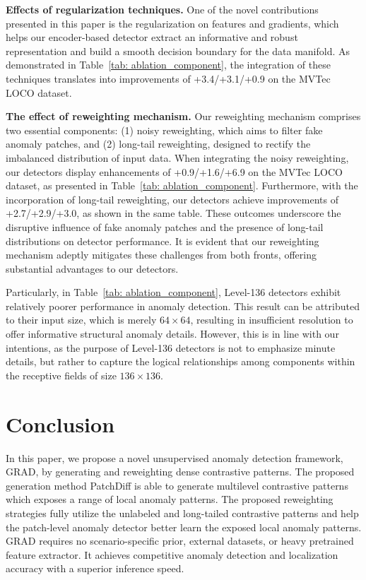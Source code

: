 \documentclass[letterpaper]{article} %
\begin{document}
\textbf{Effects of regularization techniques.} One of the novel contributions presented in this paper is the regularization on features and gradients, which helps our encoder-based detector extract an informative and robust representation and build a smooth decision boundary for the data manifold. As demonstrated in Table~\ref{tab: ablation_component}, the integration of these techniques translates into improvements of +3.4/+3.1/+0.9 on the MVTec LOCO dataset.

\textbf{The effect of reweighting mechanism.} Our reweighting mechanism comprises two essential components: (1) noisy reweighting, which aims to filter fake anomaly patches, and (2) long-tail reweighting, designed to rectify the imbalanced distribution of input data. When integrating the noisy reweighting, our detectors display enhancements of +0.9/+1.6/+6.9 on the MVTec LOCO dataset, as presented in Table~\ref{tab: ablation_component}. Furthermore, with the incorporation of long-tail reweighting, our detectors achieve improvements of +2.7/+2.9/+3.0, as shown in the same table. These outcomes underscore the disruptive influence of fake anomaly patches and the presence of long-tail distributions on detector performance. It is evident that our reweighting mechanism adeptly mitigates these challenges from both fronts, offering substantial advantages to our detectors.

Particularly, in Table~\ref{tab: ablation_component}, Level-136 detectors exhibit relatively poorer performance in anomaly detection. This result can be attributed to their input size, which is merely $64 \times 64$, resulting in insufficient resolution to offer informative structural anomaly details. However, this is in line with our intentions, as the purpose of Level-136 detectors is not to emphasize minute details, but rather to capture the logical relationships among components within the receptive fields of size $136 \times 136$.



\section{Conclusion}
In this paper, we propose a novel unsupervised anomaly detection framework, GRAD, by generating and reweighting dense contrastive patterns. The proposed generation method PatchDiff is able to generate multilevel contrastive patterns which exposes a range of local anomaly patterns. The proposed reweighting strategies fully utilize the unlabeled and long-tailed contrastive patterns and help the patch-level anomaly detector better learn the exposed local anomaly patterns. GRAD requires no scenario-specific prior, external datasets, or heavy pretrained feature extractor. It achieves competitive anomaly detection and localization accuracy with a superior inference speed.
\end{document}
